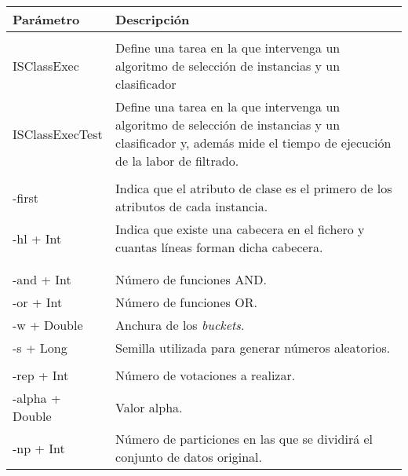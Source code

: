  \begin{table}
  \begin{center}
   \begin{tabular}{| m{3cm} | L{9cm} |}
    \hline
    \centering Parámetro &  Descripción \\
    \hline
     \\
    \hline
   	\centering ISClassExec & Define una tarea en la que intervenga un algoritmo de selección de instancias y un clasificador \\
   	\hline
   	\centering ISClassExecTest & Define una tarea en la que intervenga un algoritmo de selección de instancias y un clasificador y, además mide el tiempo de ejecución de la labor de filtrado.\\
   	\hline
   	 \\
   	\hline
   	\centering -first & Indica que el atributo de clase es el primero de los atributos de cada instancia.\\
   	\hline
   	\centering -hl + Int & Indica que existe una cabecera en el fichero y cuantas líneas forman dicha cabecera. \\
   	\hline
   	 \\
   	\hline
   	 \\
   	\hline
   	\centering -and + Int & Número de funciones AND.\\
   	\hline
   	\centering -or + Int & Número de funciones OR.\\
   	\hline
   	\centering -w + Double & Anchura de los \textit{buckets}.\\
   	\hline
   	\centering -s + Long & Semilla utilizada para generar números aleatorios.\\
   	\hline
   	 \\
   	\hline
   	\centering -rep + Int & Número de votaciones a realizar.\\
   	\hline
   	\centering -alpha +  Double & Valor alpha.\\
   	\hline
   	\centering -np +  Int & Número de particiones en las que se dividirá el conjunto de datos original. \\

\end{tabular}
\end{center}
\end{table}
